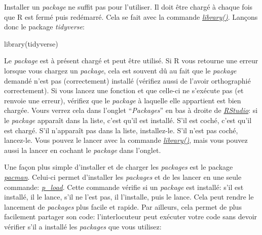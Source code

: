 \documentclass[
]{book}
\newenvironment{Shaded}{\begin{snugshade}}{\end{snugshade}}
\newcommand{\FunctionTok}[1]{\textcolor[rgb]{0.00,0.00,0.00}{#1}}
\newcommand{\NormalTok}[1]{#1}
\begin{document}
Installer un \emph{package} ne suffit pas pour l'utiliser. Il doit être chargé à chaque fois que R est fermé puis redémarré. Cela se fait avec la commande \href{https://www.rdocumentation.org/packages/base/versions/3.6.2/topics/library}{\emph{library()}}. Lançons donc le package \emph{tidyverse}:

\begin{Shaded}
\begin{Highlighting}[]
\FunctionTok{library}\NormalTok{(tidyverse)}
\end{Highlighting}
\end{Shaded}

Le \emph{package} est à présent chargé et peut être utilisé. Si R vous retourne une erreur lorsque vous chargez un \emph{package}, cela est souvent dû au fait que le \emph{package} demandé n'est pas (correctement) installé (vérifiez aussi de l'avoir orthographié correctement). Si vous lancez une fonction et que celle-ci ne s'exécute pas (et renvoie une erreur), vérifiez que le \emph{package} à laquelle elle appartient est bien chargée. Vours verrez cela dans l'onglet ``\emph{Packages}'' en bas à droite de \href{https://posit.co/}{\emph{RStudio}}: si le \emph{package} apparaît dans la liste, c'est qu'il est installé. S'il est coché, c'est qu'il est chargé. S'il n'apparaît pas dans la liste, installez-le. S'il n'est pas coché, lancez-le. Vous pouvez le lancer avec la commande \href{https://www.rdocumentation.org/packages/base/versions/3.6.2/topics/library}{\emph{library()}}, mais vous pouvez aussi la lancer en cochant le \emph{package} dans l'onglet.

Une façon plus simple d'installer et de charger les \emph{packages} est le package \href{http://trinker.github.io/pacman/vignettes/Introduction_to_pacman.html}{\emph{pacman}}. Celui-ci permet d'installer les \emph{packages} et de les lancer en une seule commande: \href{https://www.rdocumentation.org/packages/pacman/versions/0.5.1/topics/p_load}{\emph{p\_load}}. Cette commande vérifie si un \emph{package} est installé: s'il est installé, il le lance, s'il ne l'est pas, il l'installe, puis le lance. Cela peut rendre le lancement de \emph{packages} plus facile et rapide. Par ailleurs, cela permet de plus facilement partager son code: l'interlocuteur peut exécuter votre code sans devoir vérifier s'il a installé les \emph{packages} que vous utilisez:
\end{document}
